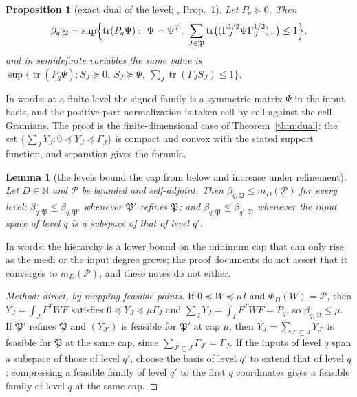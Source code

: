 \documentclass[12pt]{article}
\newcommand{\N}{\mathbb{N}}
\newcommand{\mcl}[1]{\mathcal{#1}}
\newcommand{\file}[1]{\path{#1}}
\DeclareMathOperator{\tr}{tr}
\theoremstyle{plain}
\newtheorem{lemma}[theorem]{Lemma}
\newtheorem{proposition}[theorem]{Proposition}
\theoremstyle{definition}
\theoremstyle{remark}
\begin{document}
\begin{proposition}[exact dual of the level; \file{algebraic_hierarchy_duality.md}, Prop.~1]\label{prop:level}
Let $P_q\succeq0$. Then
\[
\beta_{q,\mathfrak P}=\sup\Bigl\{\tr(P_q\Psi):\ \Psi=\Psi^T,\ \sum_{J\in\mathfrak P}\tr\bigl((\Gamma_J^{1/2}\Psi\Gamma_J^{1/2})_+\bigr)\le1\Bigr\},
\]
and in semidefinite variables the same value is $\sup\{\tr(P_q\Psi):S_J\succeq0,\ S_J\succeq\Psi,\ \sum_J\tr(\Gamma_JS_J)\le1\}$.
\end{proposition}
In words: at a finite level the signed family is a symmetric matrix $\Psi$ in the input basis, and the positive-part normalization is taken cell by cell against the cell Gramians. The proof is the finite-dimensional case of Theorem~\ref{thm:dual}: the set $\{\sum_JY_J:0\preceq Y_J\preceq\Gamma_J\}$ is compact and convex with the stated support function, and separation gives the formula.

\begin{lemma}[the levels bound the cap from below and increase under refinement]\label{lem:levels}
Let $D\in\N$ and $\mcl P$ be bounded and self-adjoint. Then $\beta_{q,\mathfrak P}\le m_D(\mcl P)$ for every level; $\beta_{q,\mathfrak P}\le\beta_{q,\mathfrak P'}$ whenever $\mathfrak P'$ refines $\mathfrak P$; and $\beta_{q,\mathfrak P}\le\beta_{q',\mathfrak P}$ whenever the input space of level $q$ is a subspace of that of level $q'$.
\end{lemma}
In words: the hierarchy is a lower bound on the minimum cap that can only rise as the mesh or the input degree grows; the proof documents do not assert that it converges to $m_D(\mcl P)$, and these notes do not either.
\begin{proof}[Method: direct, by mapping feasible points]
If $0\preceq W\preceq\mu I$ and $\Phi_D(W)=\mcl P$, then $Y_J=\int_JF^TWF$ satisfies $0\preceq Y_J\preceq\mu\Gamma_J$ and $\sum_JY_J=\int_IF^TWF=P_q$, so $\beta_{q,\mathfrak P}\le\mu$. If $\mathfrak P'$ refines $\mathfrak P$ and $(Y_{J'})$ is feasible for $\mathfrak P'$ at cap $\mu$, then $Y_J=\sum_{J'\subseteq J}Y_{J'}$ is feasible for $\mathfrak P$ at the same cap, since $\sum_{J'\subseteq J}\Gamma_{J'}=\Gamma_J$. If the inputs of level $q$ span a subspace of those of level $q'$, choose the basis of level $q'$ to extend that of level $q$; compressing a feasible family of level $q'$ to the first $q$ coordinates gives a feasible family of level $q$ at the same cap.
\end{proof}
\end{document}
